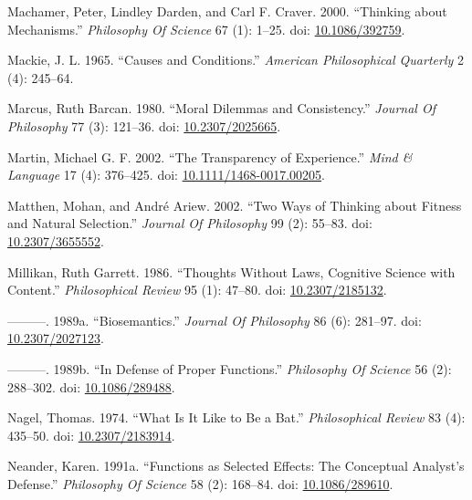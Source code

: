 \documentclass[
  10pt,
  letterpaper,
  DIV=11,
  numbers=noendperiod,
  twoside]{scrartcl}
\newlength{\cslhangindent}
\newenvironment{CSLReferences}[2] %
 {\begin{list}{}{%
  \setlength{\itemindent}{0pt}
  \setlength{\leftmargin}{0pt}
  \setlength{\parsep}{0pt}
  \ifodd #1
   \setlength{\leftmargin}{\cslhangindent}
   \setlength{\itemindent}{-1\cslhangindent}
  \fi
  \setlength{\itemsep}{#2\baselineskip}}}
 {\end{list}}
\begin{document}
\begin{CSLReferences}{1}{0}
Machamer, Peter, Lindley Darden, and Carl F. Craver. 2000. {``Thinking
about Mechanisms.''} \emph{Philosophy Of Science} 67 (1): 1--25. doi:
\href{https://doi.org/10.1086/392759}{10.1086/392759}.

Mackie, J. L. 1965. {``Causes and Conditions.''} \emph{American
Philosophical Quarterly} 2 (4): 245--64.

Marcus, Ruth Barcan. 1980. {``Moral Dilemmas and Consistency.''}
\emph{Journal Of Philosophy} 77 (3): 121--36. doi:
\href{https://doi.org/10.2307/2025665}{10.2307/2025665}.

Martin, Michael G. F. 2002. {``The Transparency of Experience.''}
\emph{Mind \& Language} 17 (4): 376--425. doi:
\href{https://doi.org/10.1111/1468-0017.00205}{10.1111/1468-0017.00205}.

Matthen, Mohan, and André Ariew. 2002. {``Two Ways of Thinking about
Fitness and Natural Selection.''} \emph{Journal Of Philosophy} 99 (2):
55--83. doi: \href{https://doi.org/10.2307/3655552}{10.2307/3655552}.

Millikan, Ruth Garrett. 1986. {``Thoughts Without Laws, Cognitive
Science with Content.''} \emph{Philosophical Review} 95 (1): 47--80.
doi: \href{https://doi.org/10.2307/2185132}{10.2307/2185132}.

---------. 1989a. {``Biosemantics.''} \emph{Journal Of Philosophy} 86
(6): 281--97. doi:
\href{https://doi.org/10.2307/2027123}{10.2307/2027123}.

---------. 1989b. {``In Defense of Proper Functions.''} \emph{Philosophy
Of Science} 56 (2): 288--302. doi:
\href{https://doi.org/10.1086/289488}{10.1086/289488}.

Nagel, Thomas. 1974. {``What Is It Like to Be a Bat.''}
\emph{Philosophical Review} 83 (4): 435--50. doi:
\href{https://doi.org/10.2307/2183914}{10.2307/2183914}.

Neander, Karen. 1991a. {``Functions as Selected Effects: The Conceptual
Analyst's Defense.''} \emph{Philosophy Of Science} 58 (2): 168--84. doi:
\href{https://doi.org/10.1086/289610}{10.1086/289610}.


\end{CSLReferences}
\end{document}
